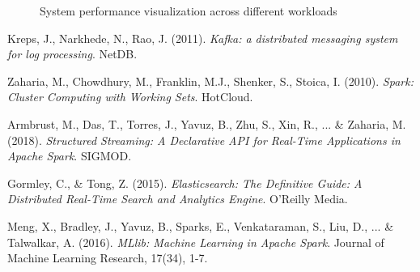 \documentclass[11pt, a4paper]{article}
\begin{document}
\begin{figure}[h]
  \centering
  \caption{System performance visualization across different workloads}
  \label{fig:conclusion}
\end{figure}

\clearpage
\begin{thebibliography}{9}
Kreps, J., Narkhede, N., Rao, J. (2011). 
\textit{Kafka: a distributed messaging system for log processing}. 
NetDB.

Zaharia, M., Chowdhury, M., Franklin, M.J., Shenker, S., Stoica, I. (2010). 
\textit{Spark: Cluster Computing with Working Sets}. 
HotCloud.

Armbrust, M., Das, T., Torres, J., Yavuz, B., Zhu, S., Xin, R., ... \& Zaharia, M. (2018). 
\textit{Structured Streaming: A Declarative API for Real-Time Applications in Apache Spark}. 
SIGMOD.

Gormley, C., \& Tong, Z. (2015). 
\textit{Elasticsearch: The Definitive Guide: A Distributed Real-Time Search and Analytics Engine}.
O'Reilly Media.

Meng, X., Bradley, J., Yavuz, B., Sparks, E., Venkataraman, S., Liu, D., ... \& Talwalkar, A. (2016).
\textit{MLlib: Machine Learning in Apache Spark}.
Journal of Machine Learning Research, 17(34), 1-7.
\end{thebibliography}
\end{document}

